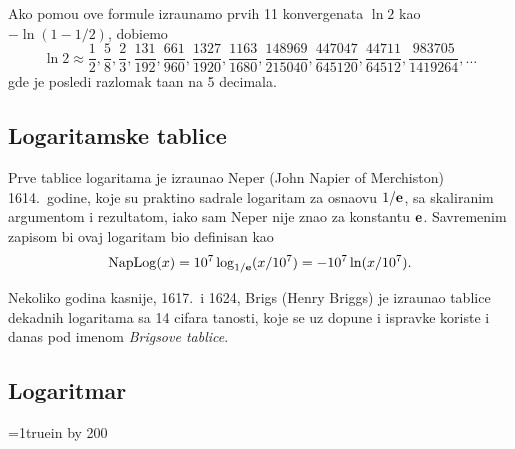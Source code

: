 \documentclass[12pt, twoside, a4paper]{article}
\def\e{{\bf e}}
\def\naplog{\mathop{\rm NapLog}\nolimits}
\begin{document}
\def\ff#1/#2/{\frac{#1}{#2}}
Ako pomo{\cc}u ove formule izra{\cv}unamo prvih 11 konvergenata $\ln2$ kao $-\ln(1-1/2)$, dobi{\cc}emo
$$
\ln2\approx\ff1/2/, \ff5/8/, \ff2/3/, \ff131/192/, \ff661/960/, \ff1327/1920/, \ff1163/1680/, \ff148969/215040/, 
\ff447047/645120/, \ff44711/64512/, \ff983705/1419264/, \dots
$$
gde je posled{\nj}i razlomak ta{\cv}an na 5 decimala.


\subsection{Logaritamske tablice}

Prve tablice logaritama je izra{\cv}unao Neper (John Napier of Merchiston)
1614.\ godine,
koje su prakti{\cv}no sadr{\zv}ale logaritam za osnaovu $1/\e$, sa skaliranim argumentom i rezultatom,
iako sam Neper nije znao za konstantu $\e$.
Savremenim zapisom bi ovaj logaritam bio definisan kao
$$
\naplog (x) = 10^7\log_{1/\e}(x/10^7) = -10^7\ln(x/10^7).
$$

Nekoliko godina kasnije, 1617.\ i 1624, Brigs (Henry Briggs) je izra{\cv}unao
tablice de\-kad\-nih logaritama sa 14 cifara ta{\cv}nosti, koje se uz dopune i ispravke
koriste i danas pod imenom {\sl Brigsove tablice}.


\subsection{Logaritmar}

\def\hair{}%
\def\extra{}%

\newdimen\px \px=1truein \divide\px by 200
\def\rstrut{\vrule width 0pt height 0.8truemm depth 0pt\relax}
\def\zbox{\hbox to 0pt\relax}
\def\cbox#1{\zbox{\hss#1\hss}}
\def\mark{\cbox{\rstrut\vrule width 1\px}}
\def\ruler#1#2{\zbox{\kern#1\u\cbox{\sf#2}\hss}}
\def\marker#1{\zbox{\kern#1\u\mark\hss}}
\def\nit#1{\zbox{\kern#1\u\cbox{\color{red}\rstrut\vrule width 1\px}\hss}}
\end{document}
